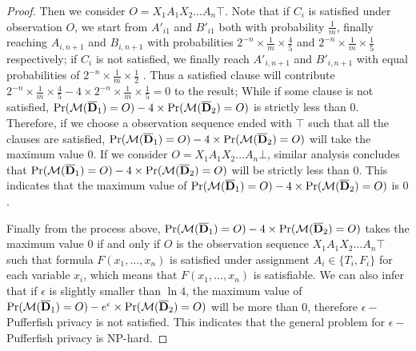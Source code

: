 \begin{proof}
  Then we consider $O=X_1A_1X_2\ldots A_n \top$. Note that if $C_i$ is satisfied under observation $O$, we start from $A'_{i1}$ and $B'_{i1}$ both with
  probability $\frac{1}{m}$, finally reaching $A_{i,n+1}$ and $B_{i,n+1}$ with probabilities $2^{-n} \times \frac{1}{m} \times \frac{4}{5}$
  and $2^{-n} \times \frac{1}{m} \times \frac{1}{5}$ respectively;
  if $C_i$ is not satisfied, we finally reach $A'_{i,n+1}$ and $B'_{i,n+1}$  with equal probabilities of $2^{-n}\times \frac{1}{m} \times \frac{1}{2}$ .
  Thus a satisfied clause will contribute $2^{-n} \times \frac{1}{m} \times \frac{4}{5} - 4 \times 2^{-n} \times \frac{1}{m} \times \frac{1}{5} = 0$ to
  the result; While if some clause is not satisfied, $\Pr (\mathcal{M} (\overline{\mathbf{D}}_1) = O)- 4\times \Pr (\mathcal{M} (\overline{\mathbf{D}}_2) = O)$ is strictly less than $0$.
  Therefore, if we choose a observation sequence ended with $\top$ such that all the
  clauses are satisfied, $\Pr (\mathcal{M} (\overline{\mathbf{D}}_1) = O)- 4\times \Pr (\mathcal{M} (\overline{\mathbf{D}}_2) = O)$ will take the maximum value 0.
  If we consider $O=X_1A_1X_2\ldots A_n \bot$, similar analysis concludes that $\Pr (\mathcal{M} (\overline{\mathbf{D}}_1) = O) - 4 \times \Pr (\mathcal{M} (\overline{\mathbf{D}}_2) = O)$
  will be strictly less than $0$.
  This indicates that the maximum value of $\Pr (\mathcal{M} (\overline{\mathbf{D}}_1) = O) - 4 \times \Pr (\mathcal{M} (\overline{\mathbf{D}}_2) = O)$ is $0$.

  Finally from the process above,
  $\Pr (\mathcal{M} (\overline{\mathbf{D}}_1) = O) - 4 \times \Pr (\mathcal{M} (\overline{\mathbf{D}}_2) = O)$ takes the maximum value $0$
  if and only if $O$ is the observation sequence $X_1A_1X_2\ldots A_n \top$ such that
  formula $F(x_1,\ldots,x_n)$ is satisfied under assignment $A_i \in \{T_i,F_i\}$ for each variable $x_i$,
  which means that $F(x_1,\ldots,x_n)$ is satisfiable.
  We can also infer that if $\epsilon$ is slightly smaller than $\ln 4$, the maximum value of
  $\Pr (\mathcal{M} (\overline{\mathbf{D}}_1) = O) - e ^\epsilon \times \Pr (\mathcal{M} (\overline{\mathbf{D}}_2) = O)$ will be more than $0$,
  therefore $\epsilon-$Pufferfish privacy is not satisfied.
  This indicates that the general problem for $\epsilon-$Pufferfish privacy is NP-hard.

 \iffalse
  The "if" direction can be immediately proved from the process of finding the maximum.
  For the "only if" direction, with proof by contradiction, assume that $\Pr (\calM (\oD_1) = O) - \Pr (\calM (\oD_2) = O)$ takes
  value $2^{-n}$ but $O$ doesn't satisfy above condition. With the analysis before, the observation must be in the form
  of $O=X_1A_1X_2\ldots A_n \top$, where the assignment implied by $O$ doesn't satisfy $F(x_1,\ldots,x_n)$.
  So some clause $C_i$ is not satisfied and starting from $A'_{ij}$ the probability of
  observe $O$ is $2^{-n-1}\times \frac{1}{m}$. Therefore the sum of all the clauses observing
  $O$ is smaller than $2^{-n}$ since a clause which is satisfied only has a distribution
  of  $2^{-n}\times \frac{1}{m}$ observing $O$. That's a contradiction.
 \fi
\end{proof} 